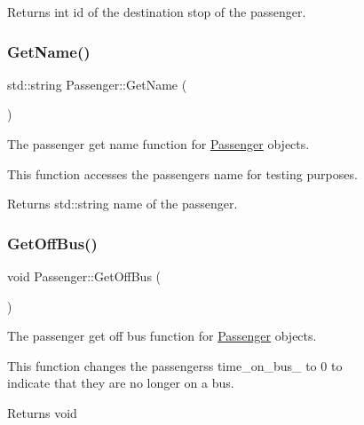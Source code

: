 \begin{figure}[H]
\begin{center}
\begin{DoxyReturn}{Returns}
int id of the destination stop of the passenger. 
\end{DoxyReturn}
\mbox{\label{classPassenger_ad186ef0e9d198895eaa2b14c66869e2b}} 
\subsubsection{\texorpdfstring{Get\+Name()}{GetName()}}
{\footnotesize\ttfamily std\+::string Passenger\+::\+Get\+Name (\begin{DoxyParamCaption}{ }\end{DoxyParamCaption})}



The passenger get name function for \hyperlink{classPassenger}{Passenger} objects. 

This function accesses the passenger\textquotesingle{}s name for testing purposes.

\begin{DoxyReturn}{Returns}
std\+::string name of the passenger. 
\end{DoxyReturn}
\mbox{\label{classPassenger_a3cabb05dbf0c185e123f8d03368ed4f1}} 
\subsubsection{\texorpdfstring{Get\+Off\+Bus()}{GetOffBus()}}
{\footnotesize\ttfamily void Passenger\+::\+Get\+Off\+Bus (\begin{DoxyParamCaption}{ }\end{DoxyParamCaption})}



The passenger get off bus function for \hyperlink{classPassenger}{Passenger} objects. 

This function changes the passengers\textquotesingle{}s time\+\_\+on\+\_\+bus\+\_\+ to 0 to indicate that they are no longer on a bus.

\begin{DoxyReturn}{Returns}
void 
\end{DoxyReturn}
\mbox{\label{classPassenger_ae2ba639cfef39781ac079778578bd9fe}} 

\end{center}
\end{figure}
